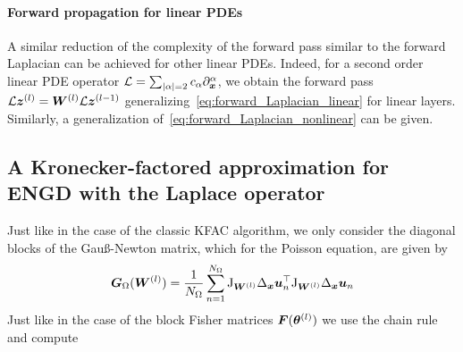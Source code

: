 \paragraph{Forward propagation for linear PDEs} 
A similar reduction of the complexity of the forward pass similar to the forward Laplacian can be achieved for other linear PDEs. 
Indeed, for a second order linear PDE operator $\mathcal L = \sum_{\lvert \alpha \rvert=2}c_\alpha \partial^\alpha_{\bm{x}}$, we obtain the forward pass $\mathcal L {\bm{z}}^{(l)} = {\bm{W}}^{(l)}\mathcal L {\bm{z}}^{(l-1)}$ generalizing~\eqref{eq:forward_Laplacian_linear} for linear layers. 
Similarly, a generalization of~\eqref{eq:forward_Laplacian_nonlinear} can be given. 


\subsection{A Kronecker-factored approximation for ENGD with the Laplace operator}\label{sec:KFAC-Laplace}
Just like in the case of the classic KFAC algorithm, we only consider the diagonal blocks of the Gauß-Newton matrix, which for the Poisson equation, are given by
\begin{align}
    {\bm{G}}_\Omega({\bm{W}}^{(l)}) = \frac1{{N_\Omega}} \sum_{n=1}^{N_\Omega} \mathrm{J}_{{\bm{W}}^{(l)}} \Delta_{\bm{x}} {\bm{u}}_n^\top \mathrm{J}_{{\bm{W}}^{(l)}} \Delta_{\bm{x}} {\bm{u}}_n
\end{align}
Just like in the case of the block Fisher matrices ${\bm{F}}({\bm{\theta}}^{(l)})$ we use the chain rule and compute
